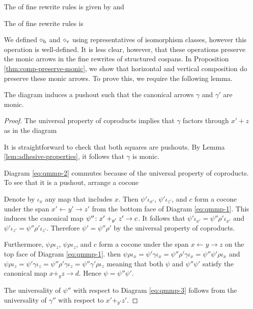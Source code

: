 \documentclass{amsart}
\begin{document}
\begin{definition} \label{def:hor-vert-composition}
  The  of fine rewrite rules is
  given by  and
  

  The  of fine rewrite rules is
  
\end{definition}

We defined $ \circ_{\textup{h}} $ and $ \circ_{\textup{v}} $ using representatives
of isomorphism classes, however this operation is
well-defined. It is less clear, however, that these
operations preserve the monic arrows in the fine rewrites of
structured cospans.  In Proposition
\ref{thm:comp-preserve-monic}, we show that horizontal and
vertical composition do preserve these monic arrows. To
prove this, we require the following lemma.

\begin{lemma}
  \label{thm:quotient-map-monic-pushout}
  The diagram 
  induces a pushout
   such that the
  canonical arrows $ \gamma $ and $ \gamma' $ are monic.
\end{lemma}

\begin{proof}
  The universal property of coproducts implies
  that $ \gamma $ factors through $ x' + z $ as in
  the diagram 
   
  It is straightforward to check that both squares are
  pushouts. By Lemma \ref{lem:adhesive-properties}, it
  follows that $ \gamma $ is monic.

  Diagram \ref{eq:qmmp-2} commutes because of the universal
  property of coproducts.  To see that it is a pushout,
  arrange a cocone
  
  
  Denote by $ \iota_x $ any map that includes $ x $.  Then
  $ \psi' \iota_{x'} $, $ \psi' \iota_{z'} $, and $ c $ form
  a cocone under the span $ x' \gets y' \to z' $ from the
  bottom face of Diagram \ref{eq:qmmp-1}. This induces the
  canonical map $ \psi'' \colon x'+_{y'} z' \to c $. It
  follows that
  $ \psi' \iota_{x'} = \psi'' \rho' \iota_{x'} $ and
  $ \psi' \iota_{z'} = \psi'' \rho' \iota_{z'} $. Therefore
  $ \psi' = \psi'' \rho' $ by the universal property of
  coproducts.

  Furthermore, $ \psi \rho \iota_z $,
  $ \psi \rho \iota_z $, and $ c $ form a cocone
  under the span $ x \gets y \to z $ on the top
  face of Diagram \ref{eq:qmmp-1}. then
  $ \psi \rho \iota_x = \psi' \gamma \iota_x =
  \psi'' \rho' \gamma \iota_x = \psi'' \psi' \rho
  \iota_x $ and
  $ \psi \rho \iota_z = \psi' \gamma \iota_z =
  \psi'' \rho' \gamma \iota_z = \psi'' \gamma'
  \rho \iota_z $ meaning that both $ \psi $ and
  $ \psi'' \psi' $ satisfy the canonical map
  $ x+_yz \to d $. Hence $ \psi = \psi'' \psi' $.

  The universality of $ \psi'' $ with respect to
  Diagram \ref{eq:qmmp-3} follows from the
  universality of $ \gamma'' $ with respect to
  $ x'+_{y'}z' $.
\end{proof}
\end{document}
